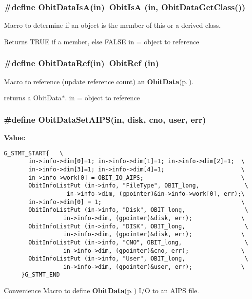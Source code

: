 \subsubsection{\setlength{\rightskip}{0pt plus 5cm}\#define Obit\-Data\-Is\-A(in)\ Obit\-Is\-A (in, Obit\-Data\-Get\-Class())}\label{ObitData_8h_a2}


Macro to determine if an object is the member of this or a derived class. 

Returns TRUE if a member, else FALSE in = object to reference 
\subsubsection{\setlength{\rightskip}{0pt plus 5cm}\#define Obit\-Data\-Ref(in)\ Obit\-Ref (in)}\label{ObitData_8h_a1}


Macro to reference (update reference count) an {\bf Obit\-Data}{\rm (p.\,\pageref{structObitData})}. 

returns a Obit\-Data$\ast$. in = object to reference 
\subsubsection{\setlength{\rightskip}{0pt plus 5cm}\#define Obit\-Data\-Set\-AIPS(in, disk, cno, user, err)}\label{ObitData_8h_a4}


{\bf Value:}

\footnotesize\begin{verbatim}G_STMT_START{   \
       in->info->dim[0]=1; in->info->dim[1]=1; in->info->dim[2]=1;  \
       in->info->dim[3]=1; in->info->dim[4]=1;                      \
       in->info->work[0] = OBIT_IO_AIPS;                            \
       ObitInfoListPut (in->info, "FileType", OBIT_long,             \
                  in->info->dim, (gpointer)&in->info->work[0], err);\
       in->info->dim[0] = 1;                                        \
       ObitInfoListPut (in->info, "Disk", OBIT_long,                 \
                 in->info->dim, (gpointer)&disk, err);              \
       ObitInfoListPut (in->info, "DISK", OBIT_long,                 \
                 in->info->dim, (gpointer)&disk, err);              \
       ObitInfoListPut (in->info, "CNO", OBIT_long,                  \
                 in->info->dim, (gpointer)&cno, err);               \
       ObitInfoListPut (in->info, "User", OBIT_long,                 \
                 in->info->dim, (gpointer)&user, err);              \
     }G_STMT_END
\end{verbatim}\normalsize 
Convenience Macro to define {\bf Obit\-Data}{\rm (p.\,\pageref{structObitData})} I/O to an AIPS file. 

